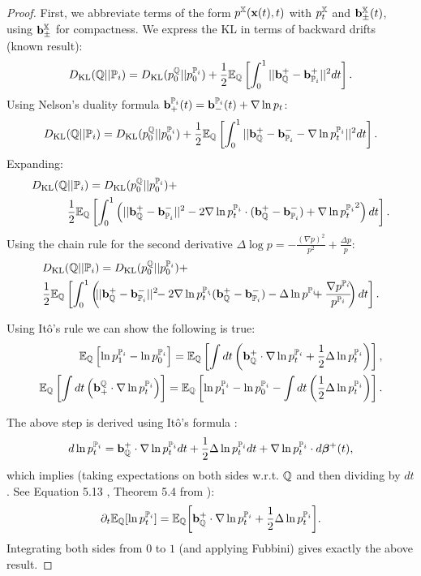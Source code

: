 \documentclass[a4paper,12pt,twoside,openright]{report}
\theoremstyle{definition}
\begin{document}
\begin{proof}
First, we  abbreviate  terms of the form $p^{{\mathbb{X}}}({\mathbf{x}}(t), t)$ with $p^{{\mathbb{X}}}_t$ and ${\mathbf{b}}^{{\mathbb{X}}}_{\pm}(t)$, using ${\mathbf{b}}^{{\mathbb{X}}}_{\pm}$ for compactness. We express the KL in terms of backward drifts (known result):
\begin{align}
D_{\mathrm{KL}}({\mathbb{Q}}||{{\mathbb{P}}_{i}}) = D_{\mathrm{KL}}( p_0^{{\mathbb{Q}}}|| p_0^{{{\mathbb{P}}_{i}}}) + \frac{1}{2}\mathbb{E}_{{\mathbb{Q}}}\left[\int_0^1 || {\mathbf{b}}_{\mathbb{Q}}^{+} -{\mathbf{b}}_{{\mathbb{P}}_{i}}^{+}||^2 dt\right].
\end{align}
Using Nelson's duality formula ${\mathbf{b}}^{{\mathbb{P}}_{i}}_+(t) ={\mathbf{b}}^{{\mathbb{P}}_{i}}_-(t) + \nabla\operatorname{ln} p_t$:
\begin{align}
D_{\mathrm{KL}}({\mathbb{Q}}||{{\mathbb{P}}_{i}}) = D_{\mathrm{KL}}( p_0^{{\mathbb{Q}}}|| p_0^{{{\mathbb{P}}_{i}}}) + \frac{1}{2}\mathbb{E}_{{\mathbb{Q}}}\left[\int_0^1 || {\mathbf{b}}_{\mathbb{Q}}^{+} - {\mathbf{b}}_{{\mathbb{P}}_{i}}^{-} - \nabla\operatorname{ln} p_t^{{\mathbb{P}}_{i}}||^2 dt\right].
\end{align}
Expanding:
\begin{align*}
D_{\mathrm{KL}}({\mathbb{Q}}&||{{\mathbb{P}}_{i}}) = D_{\mathrm{KL}}( p_0^{{\mathbb{Q}}}|| p_0^{{{\mathbb{P}}_{i}}}) +\\ &\frac{1}{2}\mathbb{E}_{{\mathbb{Q}}}\left[\int_0^1 \left(|| {\mathbf{b}}_{\mathbb{Q}}^{+} - {\mathbf{b}}_{{\mathbb{P}}_{i}}^{-}||^2 - 2\nabla\operatorname{ln} p_t^{{\mathbb{P}}_{i}} \cdot ( {\mathbf{b}}_{\mathbb{Q}}^{+} - {\mathbf{b}}_{{\mathbb{P}}_{i}}^{-}) + {\nabla\operatorname{ln} p_t^{{\mathbb{P}}_{i}}}^2 \right)dt\right].
\end{align*}
Using the chain rule for the second derivative $\Delta \log  p = -\frac{(\nabla p)^2}{ p^2}  + \frac{\Delta  p}{ p}$:
\begin{align*}
&\KL(\Q||{\P_{i}}) =\KL( p_0^{\Q}|| p_0^{{\P_{i}}}) +\\ &\frac{1}{2}\E_{\Q}\left[\int_0^1 \left(\!\!|| \rvb_\Q^{+} - \rvb_{\P_{i}}^{-}||^2 \!\!- 2\nabla\log p_t^{\P_{i}}\!\!\!\cdot \!( \rvb_\Q^{+} - \rvb_{\P_{i}}^{-}) - \Delta \log  p^{\P_{i}}\!\!\!+ \frac{\nabla  p^{\P_{i}}}{ p^{\P_{i}}}\!\!\right)dt\right].
\end{align*}

Using Itô's rule we can show the following is true: 
\begin{align*}
\mathbb{E}_{\mathbb{Q}}\left[\operatorname{ln} p^{{\mathbb{P}}_{i}}_1-\operatorname{ln} p^{{\mathbb{P}}_{i}}_0\right] = \mathbb{E}_{\mathbb{Q}}\left[\int dt \left({\mathbf{b}}^+_{\mathbb{Q}}\cdot\nabla\operatorname{ln} p_t^{{\mathbb{P}}_{i}} + \frac{1}{2}\Delta \operatorname{ln} p_t^{{\mathbb{P}}_{i}}\right)\right],\\
\mathbb{E}_{\mathbb{Q}}\left[\int dt \left({\mathbf{b}}_+^{\mathbb{Q}}\cdot\nabla\operatorname{ln} p_t^{{\mathbb{P}}_{i}} \right)\right] = \mathbb{E}_{\mathbb{Q}}\left[\operatorname{ln} p^{{\mathbb{P}}_{i}}_1-\operatorname{ln} p^{{\mathbb{P}}_{i}}_0 - \int dt \left( \frac{1}{2}\Delta \operatorname{ln} p_t^{{\mathbb{P}}_{i}}\right)\right].
\end{align*}

The above step is derived using Itô's formula :
\begin{align*}
d\operatorname{ln}  p_t^{{{\mathbb{P}}_{i}}} ={\mathbf{b}}^+_{\mathbb{Q}}\cdot\nabla\operatorname{ln} p_t^{{\mathbb{P}}_{i}} dt + \frac{1}{2}\Delta \operatorname{ln} p_t^{{\mathbb{P}}_{i}} dt + \nabla \operatorname{ln} p_t^{{\mathbb{P}}_{i}} \cdot d{\bm{\beta}}^{+}(t),
\end{align*}
which implies (taking expectations on both sides w.r.t. ${\mathbb{Q}}$ and then dividing by $dt$. See Equation 5.13 , Theorem 5.4 from \cite{sarkka2019applied}):
\begin{align*}
\partial_t \mathbb{E}_{{\mathbb{Q}}}[\operatorname{ln}  p_t^{{{\mathbb{P}}_{i}}}] = \mathbb{E}_{{\mathbb{Q}}}{\left[{\mathbf{b}}^+_{\mathbb{Q}}\cdot\nabla\operatorname{ln} p_t^{{\mathbb{P}}_{i}} + \frac{1}{2}\Delta \operatorname{ln} p_t^{{\mathbb{P}}_{i}}\right]}.
\end{align*}
Integrating both sides from $0$ to $1$ (and applying Fubbini) gives exactly the above result.


\end{proof}
\end{document}
